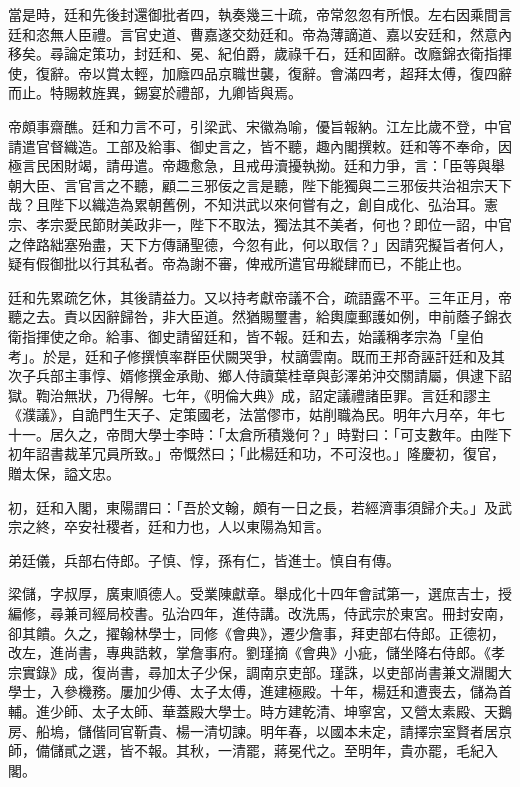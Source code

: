 \begin{pinyinscope}
當是時，廷和先後封還御批者四，執奏幾三十疏，帝常忽忽有所恨。左右因乘間言廷和恣無人臣禮。言官史道、曹嘉遂交劾廷和。帝為薄謫道、嘉以安廷和，然意內移矣。尋論定策功，封廷和、冕、紀伯爵，歲祿千石，廷和固辭。改廕錦衣衛指揮使，復辭。帝以賞太輕，加廕四品京職世襲，復辭。會滿四考，超拜太傅，復四辭而止。特賜敕旌異，錫宴於禮部，九卿皆與焉。

帝頗事齋醮。廷和力言不可，引梁武、宋徽為喻，優旨報納。江左比歲不登，中官請遣官督織造。工部及給事、御史言之，皆不聽，趣內閣撰敕。廷和等不奉命，因極言民困財竭，請毋遣。帝趣愈急，且戒毋瀆擾執拗。廷和力爭，言：「臣等與舉朝大臣、言官言之不聽，顧二三邪佞之言是聽，陛下能獨與二三邪佞共治祖宗天下哉？且陛下以織造為累朝舊例，不知洪武以來何嘗有之，創自成化、弘治耳。憲宗、孝宗愛民節財美政非一，陛下不取法，獨法其不美者，何也？即位一詔，中官之倖路絀塞殆盡，天下方傳誦聖德，今忽有此，何以取信？」因請究擬旨者何人，疑有假御批以行其私者。帝為謝不審，俾戒所遣官毋縱肆而已，不能止也。

廷和先累疏乞休，其後請益力。又以持考獻帝議不合，疏語露不平。三年正月，帝聽之去。責以因辭歸咎，非大臣道。然猶賜璽書，給輿廩郵護如例，申前蔭子錦衣衛指揮使之命。給事、御史請留廷和，皆不報。廷和去，始議稱孝宗為「皇伯考」。於是，廷和子修撰慎率群臣伏闕哭爭，杖謫雲南。既而王邦奇誣訐廷和及其次子兵部主事惇、婿修撰金承勛、鄉人侍讀葉桂章與彭澤弟沖交關請屬，俱逮下詔獄。鞫治無狀，乃得解。七年，《明倫大典》成，詔定議禮諸臣罪。言廷和謬主《濮議》，自詭門生天子、定策國老，法當僇市，姑削職為民。明年六月卒，年七十一。居久之，帝問大學士李時：「太倉所積幾何？」時對曰：「可支數年。由陛下初年詔書裁革冗員所致。」帝慨然曰；「此楊廷和功，不可沒也。」隆慶初，復官，贈太保，謚文忠。

初，廷和入閣，東陽謂曰：「吾於文翰，頗有一日之長，若經濟事須歸介夫。」及武宗之終，卒安社稷者，廷和力也，人以東陽為知言。

弟廷儀，兵部右侍郎。子慎、惇，孫有仁，皆進士。慎自有傳。

梁儲，字叔厚，廣東順德人。受業陳獻章。舉成化十四年會試第一，選庶吉士，授編修，尋兼司經局校書。弘治四年，進侍講。改洗馬，侍武宗於東宮。冊封安南，卻其饋。久之，擢翰林學士，同修《會典》，遷少詹事，拜吏部右侍郎。正德初，改左，進尚書，專典誥敕，掌詹事府。劉瑾摘《會典》小疵，儲坐降右侍郎。《孝宗實錄》成，復尚書，尋加太子少保，調南京吏部。瑾誅，以吏部尚書兼文淵閣大學士，入參機務。屢加少傅、太子太傅，進建極殿。十年，楊廷和遭喪去，儲為首輔。進少師、太子太師、華蓋殿大學士。時方建乾清、坤寧宮，又營太素殿、天鵝房、船塢，儲偕同官靳貴、楊一清切諫。明年春，以國本未定，請擇宗室賢者居京師，備儲貳之選，皆不報。其秋，一清罷，蔣冕代之。至明年，貴亦罷，毛紀入閣。


\end{pinyinscope}
